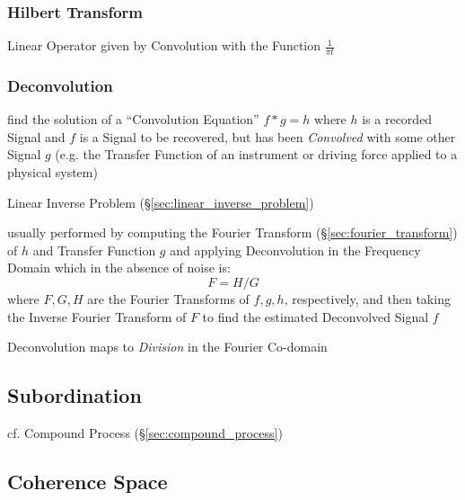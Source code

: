 \subsubsection{Hilbert Transform}\label{sec:hilbert_transform}

Linear Operator given by Convolution with the Function $\frac{1}{\pi t}$



\subsubsection{Deconvolution}\label{sec:deconvolution}

find the solution of a ``Convolution Equation'' $f * g = h$ where $h$ is a
recorded Signal and $f$ is a Signal to be recovered, but has been
\emph{Convolved} with some other Signal $g$ (e.g. the Transfer Function of an
instrument or driving force applied to a physical system)

\fist Linear Inverse Problem (\S\ref{sec:linear_inverse_problem})

usually performed by computing the Fourier Transform
(\S\ref{sec:fourier_transform}) of $h$ and Transfer Function $g$ and applying
Deconvolution in the Frequency Domain which in the absence of noise is:
\[
  F = H / G
\]
where $F, G, H$ are the Fourier Transforms of $f, g, h$, respectively, and then
taking the Inverse Fourier Transform of $F$ to find the estimated Deconvolved
Signal $f$

Deconvolution maps to \emph{Division} in the Fourier Co-domain



\subsection{Subordination}\label{sec:subordination}


cf. Compound Process (\S\ref{sec:compound_process})



\subsection{Coherence Space}\label{sec:coherence_space}


